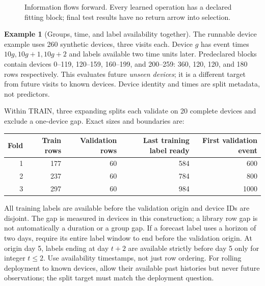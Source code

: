 \documentclass[11pt,twoside]{article}
\numberwithin{equation}{section}
\theoremstyle{plain}
\theoremstyle{definition}
\newtheorem{example}[theorem]{Example}
\theoremstyle{remark}
\begin{document}
\begin{figure}[H]\centering
{}
\caption{Information flows forward. Every learned operation has a declared
fitting block; final test results have no return arrow into selection.}
\label{fig:b4-protocol}\end{figure}

\begin{example}[Groups, time, and label availability together]
The runnable device example uses 260 synthetic devices, three visits each.
Device $g$ has event times $10g,10g+1,10g+2$ and labels available two time
units later. Predeclared blocks contain devices 0--119, 120--159, 160--199,
and 200--259: 360, 120, 120, and 180 rows respectively. This evaluates
future \emph{unseen devices}; it is a different target from future visits to
known devices. Device identity and times are split metadata, not predictors.

Within TRAIN, three expanding splits each validate on 20 complete devices
and exclude a one-device gap. Exact sizes and boundaries are:
\begin{center}\small
\begin{tabular}{rrrrr}\toprule
Fold & Train rows & Validation rows & Last training label ready & First validation event\\\midrule
1&177&60&584&600\\2&237&60&784&800\\3&297&60&984&1000\\\bottomrule
\end{tabular}\end{center}
All training labels are available before the validation origin and device IDs
are disjoint. The gap is measured in devices in this construction; a library
row gap is not automatically a duration or a group gap. If a forecast label
uses a horizon of two days, require its entire label window to end before the
validation origin. At origin day 5, labels ending at day $t+2$ are available
strictly before day 5 only for integer $t\le2$. Use availability timestamps,
not just row ordering. For rolling deployment to known devices, allow their
available past histories but never future observations; the split target must
match the deployment question.
\end{example}
\end{document}
